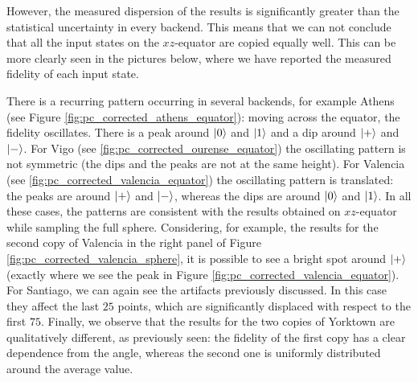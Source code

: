However, the measured dispersion of the results is significantly greater than the statistical uncertainty in every backend. 
This means that we can not conclude that all the input states on the $xz$-equator are copied equally well. 
This can be more clearly seen in the pictures below, where we have reported the measured fidelity of each input state.

There is a recurring pattern occurring in several backends, for example Athens (see Figure \ref{fig:pc_corrected_athens_equator}):
moving across the equator, the fidelity oscillates. There is a peak around $\ket{0}$ and $\ket{1}$ and a dip around $\ket{+}$ and $\ket{-}$.
For Vigo (see \ref{fig:pc_corrected_ourense_equator}) the oscillating pattern is not symmetric (the dips and the peaks are not at the same height). 
For Valencia (see \ref{fig:pc_corrected_valencia_equator}) the oscillating pattern is translated: the peaks are around $\ket{+}$ and $\ket{-}$, whereas the dips are around $\ket{0}$ and $\ket{1}$.
In all these cases, the patterns are consistent with the results obtained on $xz$-equator while sampling the full sphere. 
Considering, for example, the results for the second copy of Valencia in the right panel of Figure \ref{fig:pc_corrected_valencia_sphere}, it is possible to see a bright spot around $\ket{+}$ (exactly where we see the peak in Figure \ref{fig:pc_corrected_valencia_equator}).
For Santiago, we can again see the artifacts previously discussed. In this case they affect the last $25$ points, which are significantly displaced with respect to the first $75$.
Finally, we observe that the results for the two copies of Yorktown are qualitatively different, as previously seen: the fidelity of the first copy has a clear dependence from the angle, whereas the second one is uniformly distributed around the average value.

